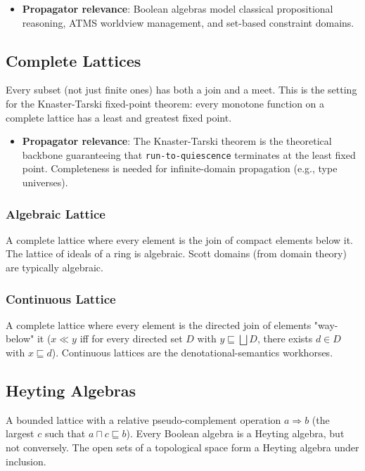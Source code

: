 \documentclass[11pt]{article}
\begin{document}
\begin{itemize}
\item \textbf{Propagator relevance}: Boolean algebras model classical propositional
reasoning, ATMS worldview management, and set-based constraint domains.
\end{itemize}
\subsection{Complete Lattices}
\label{sec:orgfea4a04}

Every subset (not just finite ones) has both a join and a meet. This is the
setting for the Knaster-Tarski fixed-point theorem: every monotone function on a
complete lattice has a least and greatest fixed point.

\begin{itemize}
\item \textbf{Propagator relevance}: The Knaster-Tarski theorem is the theoretical
backbone guaranteeing that \texttt{run-to-quiescence} terminates at the least fixed
point. Completeness is needed for infinite-domain propagation (e.g., type
universes).
\end{itemize}
\subsubsection{Algebraic Lattice}
\label{sec:org06a007c}

A complete lattice where every element is the join of compact elements below it.
The lattice of ideals of a ring is algebraic. Scott domains (from domain theory)
are typically algebraic.
\subsubsection{Continuous Lattice}
\label{sec:org59d9554}

A complete lattice where every element is the directed join of elements
"way-below" it (\(x \ll y\) iff for every directed set \(D\) with \(y \sqsubseteq
\bigsqcup D\), there exists \(d \in D\) with \(x \sqsubseteq d\)). Continuous
lattices are the denotational-semantics workhorses.
\subsection{Heyting Algebras}
\label{sec:orgd961eee}

A bounded lattice with a relative pseudo-complement operation \(a \Rightarrow b\)
(the largest \(c\) such that \(a \sqcap c \sqsubseteq b\)). Every Boolean algebra is
a Heyting algebra, but not conversely. The open sets of a topological space form
a Heyting algebra under inclusion.
\end{document}
